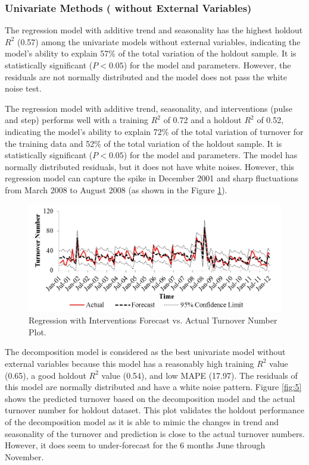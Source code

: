 \subsubsection{Univariate Methods (	without External Variables)}
The regression model with additive trend and seasonality has the highest holdout$R^2$ (0.57) among the univariate models without external variables, indicating the model’s ability to explain 57\% of the total variation of the holdout sample. It is statistically significant ($P<0.05$) for the model and parameters. However, the residuals are not normally distributed and the model does not pass the white noise test. 

The regression model with additive trend, seasonality, and interventions (pulse and step) performs well with a training  $R^2$ of 0.72 and a holdout $R^2$ of 0.52, indicating the model’s ability to explain 72\% of the total variation of turnover for the training data and 52\% of the total variation of the holdout sample. It is statistically significant ($P<0.05$) for the model and parameters. The model has normally distributed residuals, but it does not have white noises. However, this regression model can capture the spike in December 2001 and sharp fluctuations from March 2008 to August 2008 (as shown in the Figure \ref{fig:4}). 
\begin{figure}
	\centering
	\includegraphics[width=5.5in]{Fig4.jpg}
	\caption{Regression with Interventions Forecast vs. Actual Turnover Number Plot.}
	\label{fig:4}
\end{figure}
The decomposition model is considered as the best univariate model without external variables because this model has a reasonably high training $R^2$ value (0.65), a good holdout $R^2$ value (0.54), and low MAPE (17.97). The residuals of this model are normally distributed and have a white noise pattern. Figure \ref{fig:5} shows the predicted turnover based on the decomposition model and the actual turnover number for holdout dataset. This plot validates the holdout performance of the decomposition model as it is able to mimic the changes in trend and seasonality of the turnover and prediction is close to the actual turnover numbers. However, it does seem to under-forecast for the 6 months June through November.
